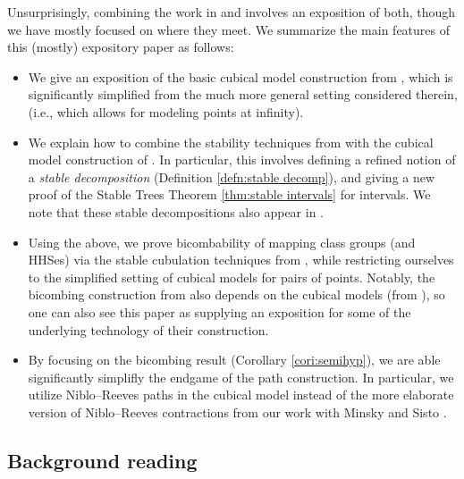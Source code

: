 \documentclass{amsart}
\theoremstyle{definition}
\theoremstyle{remark}
\theoremstyle{definition}
\begin{document}
Unsurprisingly, combining the work in \cite{DMS_bary} and \cite{Dur_infcube} involves an exposition of both, though we have mostly focused on where they meet.  We summarize the main features of this (mostly) expository paper as follows:

\begin{itemize}
\item We give an exposition of the basic cubical model construction from \cite{Dur_infcube}, which is significantly simplified from the much more general setting considered therein, (i.e., which allows for modeling points at infinity).

\item We explain how to combine the stability techniques from \cite{DMS_bary} with the cubical model construction of \cite{Dur_infcube}.  In particular, this involves defining a refined notion of a \emph{stable decomposition} (Definition \ref{defn:stable decomp}), and giving a new proof of the Stable Trees Theorem \ref{thm:stable intervals} for intervals.  We note that these stable decompositions also appear in \cite{DMS_FJ}.

\item Using the above, we prove bicombability of mapping class groups (and HHSes) via the stable cubulation techniques from \cite{DMS_bary}, while restricting ourselves to the simplified setting of cubical models for pairs of points.  Notably, the bicombing construction from \cite{HHP} also depends on the cubical models (from \cite{HHS_quasi}), so one can also see this paper as supplying an exposition for some of the underlying technology of their construction.

\item By focusing on the bicombing result (Corollary \ref{cori:semihyp}), we are able significantly simplifly the endgame of the path construction.  In particular, we utilize Niblo--Reeves paths \cite{NibloReeves} in the cubical model instead of the more elaborate version of Niblo--Reeves contractions from our work with Minsky and Sisto \cite[Section 5]{DMS_bary}.
\end{itemize}

\subsection{Background reading}
\end{document}
